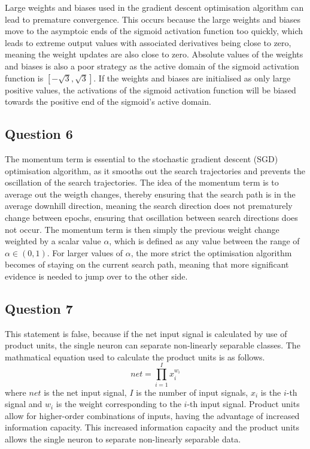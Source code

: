 \documentclass[10pt]{article}
\begin{document}
Large weights and biases used in the gradient descent optimisation algorithm can lead to premature convergence.
This occurs because the large weights and biases move to the asymptoic ends of the sigmoid activation function too quickly,
which leads to extreme output values with associated derivatives being close to zero, meaning the weight updates are
also close to zero. Absolute values of the weights and biases is also a poor strategy as the active domain of the sigmoid
activation function is $[-\sqrt{3}, \sqrt{3}]$. If the weights and biases are initialised as only large positive values,
the activations of the sigmoid activation function will be biased towards the positive end of the sigmoid's active domain.

\subsection*{Question 6}

The momentum term is essential to the stochastic gradient descent (SGD) optimisation algorithm, as it smooths
out the search trajectories and prevents the oscillation of the search trajectories. The idea of the momentum
term is to average out the weigth changes, thereby ensuring that the search path is in the average downhill
direction, meaning the search direction does not prematurely change between epochs, ensuring that oscillation
between search directions does not occur. The momentum term is then simply the previous weight change weighted
by a scalar value $\alpha$, which is defined as any value between the range of $\alpha \in (0,1)$.
For larger values of $\alpha$, the more strict the optimisation algorithm becomes of staying on the current search
path, meaning that more significant evidence is needed to jump over to the other side.

\subsection*{Question 7}

This statement is false, because if the net input signal is calculated by use of product units, the single
neuron can separate non-linearly separable classes. The mathmatical equation used to calculate the product units
is as follows.
\begin{equation}
    net = \prod_{i=1}^{I} x_{i}^{w_i}
\end{equation}
where $net$ is the net input signal, $I$ is the number of input signals, $x_i$ is the $i$-th signal and $w_i$
is the weight corresponding to the $i$-th input signal. Product units allow for higher-order
combinations of inputs, having the advantage of increased information capacity. This increased
information capacity and the product units allows the single neuron to separate non-linearly
separable data.
\end{document}
